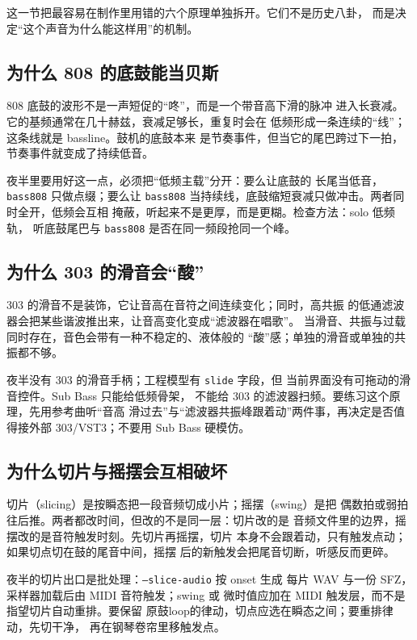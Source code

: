 这一节把最容易在制作里用错的六个原理单独拆开。它们不是历史八卦，
而是决定“这个声音为什么能这样用”的机制。

\subsection{为什么 808 的底鼓能当贝斯}
\label{sec:iconic-why-808}

808 底鼓的波形不是一声短促的“咚”，而是一个带音高下滑的脉冲
进入长衰减。它的基频通常在几十赫兹，衰减足够长，重复时会在
低频形成一条连续的“线”；这条线就是 bassline。鼓机的底鼓本来
是节奏事件，但当它的尾巴跨过下一拍，节奏事件就变成了持续低音。

夜半里要用好这一点，必须把“低频主载”分开：要么让底鼓的
长尾当低音，\texttt{bass808} 只做点缀；要么让 \texttt{bass808}
当持续线，底鼓缩短衰减只做冲击。两者同时全开，低频会互相
掩蔽，听起来不是更厚，而是更糊。检查方法：solo 低频轨，
听底鼓尾巴与 \texttt{bass808} 是否在同一频段抢同一个峰。

\subsection{为什么 303 的滑音会“酸”}
\label{sec:iconic-why-303}

303 的滑音不是装饰，它让音高在音符之间连续变化；同时，高共振
的低通滤波器会把某些谐波推出来，让音高变化变成“滤波器在唱歌”。
当滑音、共振与过载同时存在，音色会带有一种不稳定的、液体般的
“酸”感；单独的滑音或单独的共振都不够。

夜半没有 303 的滑音手柄；工程模型有 \texttt{slide} 字段，但
当前界面没有可拖动的滑音控件。Sub Bass 只能给低频骨架，
不能给 303 的滤波器扫频。要练习这个原理，先用参考曲听“音高
滑过去”与“滤波器共振峰跟着动”两件事，再决定是否值得接外部
303/VST3；不要用 Sub Bass 硬模仿。

\subsection{为什么切片与摇摆会互相破坏}
\label{sec:iconic-why-slicing}

切片（slicing）是按瞬态把一段音频切成小片；摇摆（swing）是把
偶数拍或弱拍往后推。两者都改时间，但改的不是同一层：切片改的是
音频文件里的边界，摇摆改的是音符触发时刻。先切片再摇摆，切片
本身不会跟着动，只有触发点动；如果切点切在鼓的尾音中间，摇摆
后的新触发会把尾音切断，听感反而更碎。

夜半的切片出口是批处理：\texttt{--slice-audio} 按 onset 生成
每片 WAV 与一份 SFZ，采样器加载后由 MIDI 音符触发；swing 或
微时值应加在 MIDI 触发层，而不是指望切片自动重排。要保留
原鼓loop的律动，切点应选在瞬态之间；要重排律动，先切干净，
再在钢琴卷帘里移触发点。

